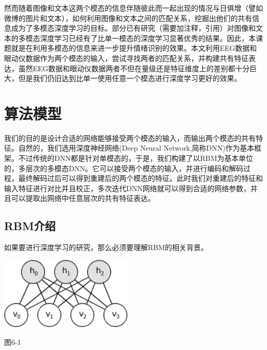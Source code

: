 	然而随着图像和文本这两个模态的信息伴随彼此而一起出现的情况与日俱增（譬如微博的图片和文本），如何利用图像和文本之间的匹配关系，挖掘出他们的共有信息成为了多模态深度学习的目标。部分已有研究（需要加注释，引用）对图像和文本的多模态深度学习已经有了比单一模态的深度学习显著优秀的结果。因此，本课题就是在利用多模态的信息来进一步提升情绪识别的效果。本文利用EEG数据和眼动仪数据作为两个模态的输入，尝试寻找两者的匹配关系，并构建共有特征表达，虽然EEG数据和眼动仪数据两者不但在量级还是特征维度上的差别都十分巨大，但是我们仍旧达到比单一使用任意一个模态进行深度学习更好的效果。

\section{算法模型}
	我们的目的是设计合适的网络能够接受两个模态的输入，而输出两个模态的共有特征。自然的，我们选用深度神经网络(Deep Neural Network,简称DNN)作为基本框架。不过传统的DNN都是针对单模态的，于是，我们构建了以RBM为基本单位的，多层次的多模态DNN。它可以接受两个模态的输入，并进行编码和解码过程，最终解码过后可以得到重建后的两个模态的特征。此时我们对重建后的特征和输入特征进行对比并且校正，多次迭代DNN网络就可以得到合适的网络参数，并且可以提取出网络中任意层次的共有特征表达。
	\subsection{RBM介绍}
	如果要进行深度学习的研究，那么必须要理解RBM的相关背景。\\
	\par
	\centerline{\includegraphics[width=2.5in]{figure/rbm.png}} %
	\centerline{图6-1}

